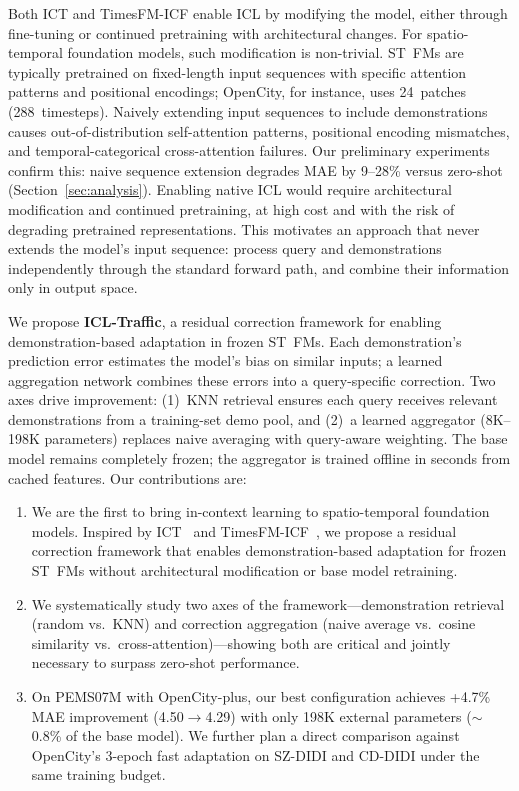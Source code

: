 \documentclass[conference]{IEEEtran}
\begin{document}
Both ICT and TimesFM-ICF enable ICL by modifying the model, either through fine-tuning or continued pretraining with architectural changes.
For spatio-temporal foundation models, such modification is non-trivial.
ST~FMs are typically pretrained on fixed-length input sequences with specific attention patterns and positional encodings; OpenCity, for instance, uses 24~patches (288~timesteps).
Naively extending input sequences to include demonstrations causes out-of-distribution self-attention patterns, positional encoding mismatches, and temporal-categorical cross-attention failures.
Our preliminary experiments confirm this: naive sequence extension degrades MAE by 9--28\% versus zero-shot (Section~\ref{sec:analysis}).
Enabling native ICL would require architectural modification and continued pretraining, at high cost and with the risk of degrading pretrained representations.
This motivates an approach that never extends the model's input sequence: process query and demonstrations independently through the standard forward path, and combine their information only in output space.

We propose \textbf{ICL-Traffic}, a residual correction framework for enabling demonstration-based adaptation in frozen ST~FMs.
Each demonstration's prediction error estimates the model's bias on similar inputs; a learned aggregation network combines these errors into a query-specific correction.
Two axes drive improvement: (1)~KNN retrieval ensures each query receives relevant demonstrations from a training-set demo pool, and (2)~a learned aggregator (8K--198K parameters) replaces naive averaging with query-aware weighting.
The base model remains completely frozen; the aggregator is trained offline in seconds from cached features.
Our contributions are:

\begin{enumerate}
\item We are the first to bring in-context learning to spatio-temporal foundation models. Inspired by ICT~\cite{chen2022ict} and TimesFM-ICF~\cite{das2024icf}, we propose a residual correction framework that enables demonstration-based adaptation for frozen ST~FMs without architectural modification or base model retraining.

\item We systematically study two axes of the framework---demonstration retrieval (random vs.\ KNN) and correction aggregation (naive average vs.\ cosine similarity vs.\ cross-attention)---showing both are critical and jointly necessary to surpass zero-shot performance.

\item On PEMS07M with OpenCity-plus, our best configuration achieves +4.7\% MAE improvement (4.50$\to$4.29) with only 198K external parameters (${\sim}$0.8\% of the base model). We further plan a direct comparison against OpenCity's 3-epoch fast adaptation on SZ-DIDI and CD-DIDI under the same training budget.
\end{enumerate}
\end{document}
